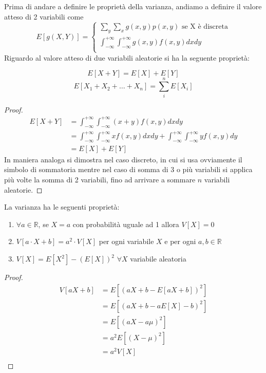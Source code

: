 \documentclass[a4paper,12pt, oneside]{book}
\newcommand{\numberset}{\mathbb}
\newcommand{\R}{\numberset{R}}
\begin{document}
Prima di andare a definire le proprietà della varianza, andiamo a definire il valore atteso di 2 variabili come
\[ E[g(X, Y)] = \begin{cases}
                    \sum _y \sum _x g(x, y) p(x, y) \mbox{ se X è discreta} \\
                    \int _{-\infty}^{+\infty} \int _{-\infty}^{+\infty} g(x, y) f(x, y) dx dy \\
                \end{cases} \]
Riguardo al valore atteso di due variabili aleatorie si ha la seguente proprietà:
\begin{teo}
    \[ E[X + Y] = E[X] + E[Y] \]
    \[ E[X_1 + X_2 + \dots + X_n] = \sum _i ^ n E[X_i] \]
\end{teo}
\begin{proof}
    \[ \begin{split}
        E[X + Y] & = \int _{-\infty}^{+\infty} \int _{-\infty}^{+\infty} (x + y) f(x, y) dx dy\\
                 & = \int _{-\infty}^{+\infty} \int _{-\infty}^{+\infty} x f(x, y) dx dy + 
                     \int _{-\infty}^{+\infty} \int _{-\infty}^{+\infty} y f(x, y) dy \\
                 & = E[X] + E[Y] 
        \end{split} \]
    In maniera analoga si dimostra nel caso discreto, in cui si usa ovviamente il simbolo di sommatoria 
    mentre nel caso di somma di 3 o più variabili si applica più volte la somma di 2 variabili, fino ad arrivare 
    a sommare $n$ variabili aleatorie.
\end{proof}
La varianza ha le seguenti proprietà:
\begin{enumerate}
    \item $\forall a \in \R$, se $X = a$ con probabilità uguale ad 1 allora $V[X] = 0$
    \item $V[a\cdot X + b] = a^2 \cdot V[X]$ per ogni variabile $X$ e per ogni $a,b \in \R$
    \item $V[X] = E[X^2] - (E[X])^2\,\,\forall X$ variabile aleatoria
\end{enumerate}
\begin{proof}
    \[ \begin{split}
        V[aX + b] & = E[(aX + b - E[aX + b])^2] \\
                  & = E[(aX + b - aE[X] - b)^2] \\
                  & = E[(aX - a\mu)^2] \\
                  & = a^2 E[(X - \mu)^2] \\
                  & = a^2 V[X]\\
       \end{split} \]
\end{proof}
\end{document}
